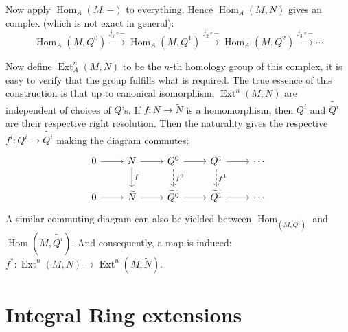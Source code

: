 \documentclass[12pt]{article}
\theoremstyle{definition}
\theoremstyle{plain}
\DeclareMathOperator{\Hom}{Hom}
\DeclareMathOperator{\Ext}{Ext}
\renewcommand{\tilde}{\widetilde}
\begin{document}
 \medskip
 Now apply $\Hom_A(M, -)$ to everything. Hence $\Hom_A(M, N)$ gives an complex (which is not exact in general):
 $$\Hom_A(M, Q^0)\overset{j_1\circ-}{\to} \Hom_A(M, Q^1)\overset{j_2\circ-}{\to} \Hom_A(M, Q^2)\overset{j_3\circ-}{\to} \cdots$$

 Now define $\Ext_A^n(M, N)$ to be the $n$-th homology group of this complex, it is easy to verify that the group fulfills what is required.
 \Rmk The true essence of this construction is that up to canonical isomorphism, $\Ext^n(M, N)$ are independent of choices of $Q$'s.
 \Rmk If $f:N\to \tilde{N}$ is a homomorphism, then $Q^i$ and $\tilde{Q^i}$ are their respective right resolution. Then the naturality gives the respective $f^i: Q^i\to \tilde{Q^i}$ making the diagram commutes:
 \begin{equation}
   \begin{tikzcd}
     0\ar{r} &N\ar{r}\ar{d}{f} & Q^0\ar{r}\ar[dashed]{d}{f^0} & Q^1\ar{r}\ar[dashed]{d}{f^1} &\cdots\\
     0\ar{r} & \tilde{N}\ar{r} &\tilde{Q^0}\ar{r} & \tilde{Q^1}\ar{r} & \cdots
   \end{tikzcd}
 \end{equation}
 A similar commuting diagram can also be yielded between $\Hom_(M, Q^i)$ and $\Hom(M, \tilde{Q^i})$. And consequently, a map is induced: $f^*:\Ext^n(M, N)\to \Ext^n(M, \tilde{N})$.

 \section{Integral Ring extensions}
\end{document}
